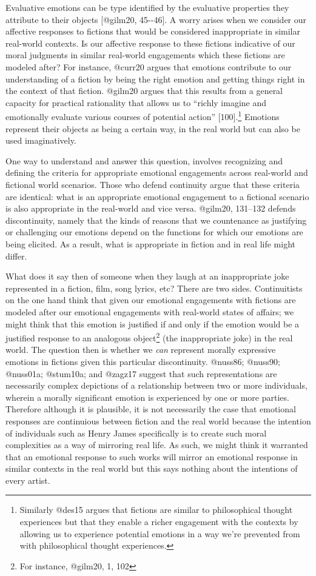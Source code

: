 \documentclass[
  letterpaper,
  DIV=11,
  numbers=noendperiod]{scrartcl}
\theoremstyle{remark}
\begin{document}
Evaluative emotions can be type identified by the evaluative properties
they attribute to their objects {[}@gilm20, 45-\/-46{]}. A worry arises
when we consider our affective responses to fictions that would be
considered inappropriate in similar real-world contexts. Is our
affective response to these fictions indicative of our moral judgments
in similar real-world engagements which these fictions are modeled
after? For instance, @curr20 argues that emotions contribute to our
understanding of a fiction by being the right emotion and getting things
right in the context of that fiction. @gilm20 argues that this results
from a general capacity for practical rationality that allows us to
``richly imagine and emotionally evaluate various courses of potential
action'' {[}100{]}.\footnote{Similarly @des15 argues that fictions are
  similar to philosophical thought experiences but that they enable a
  richer engagement with the contexts by allowing us to experience
  potential emotions in a way we're prevented from with philosophical
  thought experiences.} Emotions represent their objects as being a
certain way, in the real world but can also be used imaginatively.

One way to understand and answer this question, involves recognizing and
defining the criteria for appropriate emotional engagements across
real-world and fictional world scenarios. Those who defend continuity
argue that these criteria are identical: what is an appropriate
emotional engagement to a fictional scenario is also appropriate in the
real-world and vice versa. @gilm20, 131--132 defends discontinuity,
namely that the kinds of reasons that we countenance as justifying or
challenging our emotions depend on the functions for which our emotions
are being elicited. As a result, what is appropriate in fiction and in
real life might differ.

What does it say then of someone when they laugh at an inappropriate
joke represented in a fiction, film, song lyrics, etc? There are two
sides. Continuitists on the one hand think that given our emotional
engagements with fictions are modeled after our emotional engagements
with real-world states of affairs; we might think that this emotion is
justified if and only if the emotion would be a justified response to an
analogous object\footnote{For instance, @gilm20, 1, 102} (the
inappropriate joke) in the real world. The question then is whether we
\emph{can} represent morally expressive emotions in fictions given this
particular discontinuity. @nuss86; @nuss90; @nuss01a; @stum10a; and
@zagz17 suggest that such representations are necessarily complex
depictions of a relationship between two or more individuals, wherein a
morally significant emotion is experienced by one or more parties.
Therefore although it is plausible, it is not necessarily the case that
emotional responses are continuious between fiction and the real world
because the intention of individuals such as Henry James specifically is
to create such moral complexities as a way of mirroring real life. As
such, we might think it warranted that an emotional response to such
works will mirror an emotional response in similar contexts in the real
world but this says nothing about the intentions of every artist.
\end{document}
